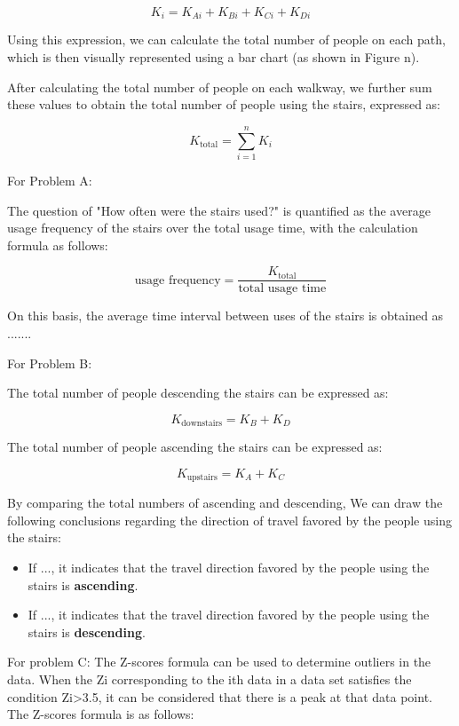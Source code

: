 \documentclass{mcmthesis}
\begin{document}
\[ K_i = K_{Ai} + K_{Bi} + K_{Ci} + K_{Di} \]

Using this expression, we can calculate the total number of people on each path, which is then visually represented using a bar chart (as shown in Figure n).

After calculating the total number of people on each walkway, we further sum these values to obtain the total number of people using the stairs, expressed as:

\[ K_{\text{total}} = \sum_{i=1}^n K_i \]


For Problem A:

The question of "How often were the stairs used?" is quantified as the average usage frequency of the stairs over the total usage time, with the calculation formula as follows:

\[ \text{usage frequency} = \frac{K_{\text{total}}}{\text{total usage time}} \]

On this basis, the average time interval between uses of the stairs is obtained as .......

For Problem B:

The total number of people descending the stairs can be expressed as:

\[ K_{\text{downstairs}} = K_B + K_D \]

The total number of people ascending the stairs can be expressed as:

\[ K_{\text{upstairs}} = K_A + K_C \]

By comparing the total numbers of ascending and descending, We can draw the following conclusions regarding the direction of travel favored by the people using the stairs:

\begin{itemize} 

\item If \(...\), it indicates that the travel direction favored by the people using the stairs is \textbf{ascending}. %

\item If \(...\), it indicates that the travel direction favored by the people using the stairs is \textbf{descending}. %

\end{itemize}


For problem C:
The Z-scores formula can be used to determine outliers in the data. When the Zi corresponding to the ith data in a data set satisfies the condition Zi>3.5\cite{curtis2016mystery}, it can be considered that there is a peak at that data point. The Z-scores formula is as follows:
\end{document}
